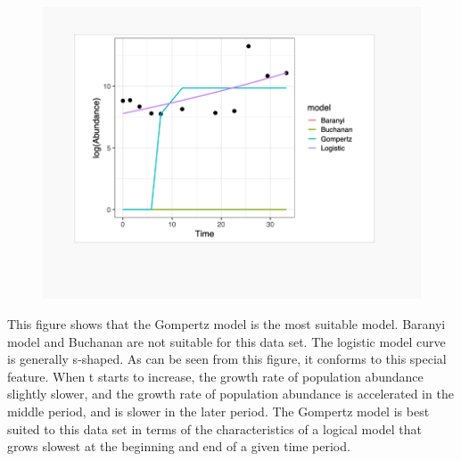 \documentclass[11pt,a4 paper,title page]{article}
\begin{document}
\begin{figure}[H]
\centering
\includegraphics[width=.8\textwidth]{../picture/figure15.png}
\end{figure}
  \hfill\break
This figure shows that the Gompertz model is the most suitable model. Baranyi model and Buchanan are not suitable for this data set. The logistic model curve is generally s-shaped. As can be seen from this figure, it conforms to this special feature. When t starts to increase, the growth rate of population abundance slightly slower, and the growth rate of population abundance is accelerated in the middle period, and is slower in the later period. The Gompertz model is best suited to this data set in terms of the characteristics of a logical model that grows slowest at the beginning and end of a given time period.
\end{document}
